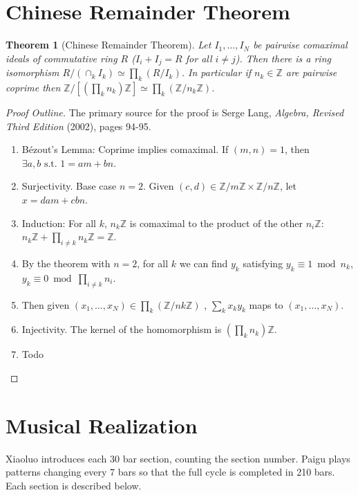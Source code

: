 \documentclass[12pt]{article}
\newtheorem*{theorem}{Theorem}
\begin{document}
\section{Chinese Remainder Theorem}

\begin{theorem}[Chinese Remainder Theorem]
  Let $I_1,\ldots,I_N$ be pairwise comaximal ideals of commutative
  ring $R$ ($I_i+I_j = R$ for all $i\ne j$). Then there is a ring
  isomorphism $R / (\cap_k I_k) \simeq \prod_k (R / I_k)$. In
  particular if $n_k \in \mathbb{Z}$ are pairwise coprime then
  $\mathbb{Z} / [(\prod_k n_k)\mathbb{Z}] \simeq \prod_k (\mathbb{Z} /
  n_k\mathbb{Z})$.
\end{theorem}

\begin{proof}[Proof Outline]
  The primary source for the proof is Serge Lang, \textit{Algebra,
    Revised Third Edition} (2002), pages 94-95.
  \begin{enumerate}
    \item Bézout’s Lemma: Coprime implies comaximal. If $(m,n) = 1$,
      then $\exists a,b \text{ s.t. } 1 = am + bn$.
    \item Surjectivity. Base case $n=2$. Given $(c,d) \in \mathbb{Z} /
      m\mathbb{Z} \times \mathbb{Z} / n\mathbb{Z}$, let $x =dam + cbn$.
    \item Induction: For all $k$, $n_k\mathbb{Z}$ is comaximal to the
      product of the other $n_i\mathbb{Z}$: $n_k\mathbb{Z} + \prod_{i
      \ne k}n_k\mathbb{Z} = \mathbb{Z}$.
    \item By the theorem with $n=2$, for all $k$ we can find $y_k$
      satisfying $y_k \equiv 1 \bmod n_k$, $y_k \equiv 0 \bmod \prod_{i\ne
        k}n_i$.
    \item Then given $(x_1,\ldots,x_N) \in \prod_k (\mathbb{Z} /
      nk\mathbb{Z})$ , $\sum_k x_ky_k$ maps to $(x_1,\ldots,x_N)$.
    \item Injectivity. The kernel of the homomorphism is
      $(\prod_k n_k)\mathbb{Z}$.
    \item Todo
  \end{enumerate}
\end{proof}

\section{Musical Realization}

Xiaoluo introduces each 30 bar section, counting the section
number. Paigu plays patterns changing every 7 bars so that the full
cycle is completed in 210 bars. Each section is described below.
\end{document}
